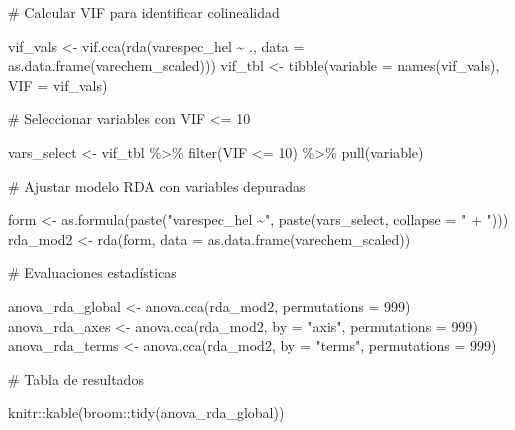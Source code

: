 \documentclass[
  spanish,
  11pt,
  a4paper,
  DIV=11,
  numbers=noendperiod]{scrartcl}
\newenvironment{Shaded}{\begin{snugshade}}{\end{snugshade}}
\newcommand{\AttributeTok}[1]{\textcolor[rgb]{0.40,0.45,0.13}{#1}}
\newcommand{\CommentTok}[1]{\textcolor[rgb]{0.37,0.37,0.37}{#1}}
\newcommand{\DecValTok}[1]{\textcolor[rgb]{0.68,0.00,0.00}{#1}}
\newcommand{\FunctionTok}[1]{\textcolor[rgb]{0.28,0.35,0.67}{#1}}
\newcommand{\NormalTok}[1]{\textcolor[rgb]{0.00,0.23,0.31}{#1}}
\newcommand{\OtherTok}[1]{\textcolor[rgb]{0.00,0.23,0.31}{#1}}
\newcommand{\SpecialCharTok}[1]{\textcolor[rgb]{0.37,0.37,0.37}{#1}}
\newcommand{\StringTok}[1]{\textcolor[rgb]{0.13,0.47,0.30}{#1}}
\begin{document}
\begin{Shaded}
\begin{Highlighting}[numbers=left,,]
\CommentTok{\#  Calcular VIF para identificar colinealidad}

\NormalTok{vif\_vals }\OtherTok{\textless{}{-}} \FunctionTok{vif.cca}\NormalTok{(}\FunctionTok{rda}\NormalTok{(varespec\_hel }\SpecialCharTok{\textasciitilde{}}\NormalTok{ .,}
\AttributeTok{data =} \FunctionTok{as.data.frame}\NormalTok{(varechem\_scaled)))}
\NormalTok{vif\_tbl }\OtherTok{\textless{}{-}} \FunctionTok{tibble}\NormalTok{(}\AttributeTok{variable =} \FunctionTok{names}\NormalTok{(vif\_vals), }\AttributeTok{VIF =}\NormalTok{ vif\_vals)}

\CommentTok{\# Seleccionar variables con VIF \textless{}= 10}

\NormalTok{vars\_select }\OtherTok{\textless{}{-}}\NormalTok{ vif\_tbl }\SpecialCharTok{\%\textgreater{}\%}
\FunctionTok{filter}\NormalTok{(VIF }\SpecialCharTok{\textless{}=} \DecValTok{10}\NormalTok{) }\SpecialCharTok{\%\textgreater{}\%}
\FunctionTok{pull}\NormalTok{(variable)}

\CommentTok{\# Ajustar modelo RDA con variables depuradas}

\NormalTok{form }\OtherTok{\textless{}{-}} \FunctionTok{as.formula}\NormalTok{(}\FunctionTok{paste}\NormalTok{(}\StringTok{"varespec\_hel \textasciitilde{}"}\NormalTok{, }\FunctionTok{paste}\NormalTok{(vars\_select,}
\AttributeTok{collapse =} \StringTok{" + "}\NormalTok{)))}
\NormalTok{rda\_mod2 }\OtherTok{\textless{}{-}} \FunctionTok{rda}\NormalTok{(form, }\AttributeTok{data =} \FunctionTok{as.data.frame}\NormalTok{(varechem\_scaled))}

\CommentTok{\# Evaluaciones estadísticas}

\NormalTok{anova\_rda\_global }\OtherTok{\textless{}{-}} \FunctionTok{anova.cca}\NormalTok{(rda\_mod2, }\AttributeTok{permutations =} \DecValTok{999}\NormalTok{)}
\NormalTok{anova\_rda\_axes   }\OtherTok{\textless{}{-}} \FunctionTok{anova.cca}\NormalTok{(rda\_mod2, }\AttributeTok{by =} \StringTok{"axis"}\NormalTok{, }\AttributeTok{permutations =} \DecValTok{999}\NormalTok{)}
\NormalTok{anova\_rda\_terms  }\OtherTok{\textless{}{-}} \FunctionTok{anova.cca}\NormalTok{(rda\_mod2, }\AttributeTok{by =} \StringTok{"terms"}\NormalTok{, }\AttributeTok{permutations =} \DecValTok{999}\NormalTok{)}

\CommentTok{\# Tabla de resultados}

\NormalTok{knitr}\SpecialCharTok{::}\FunctionTok{kable}\NormalTok{(broom}\SpecialCharTok{::}\FunctionTok{tidy}\NormalTok{(anova\_rda\_global))}
\end{Highlighting}
\end{Shaded}
\end{document}
